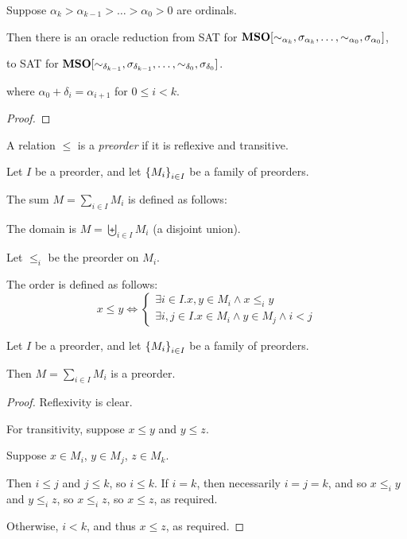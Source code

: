 \begin{theorem}
  Suppose $\alpha_k > \alpha_{k - 1} > \ldots > \alpha_0 > 0$ are ordinals.

  Then there is an oracle reduction from SAT for $\mathbf{MSO}[
      \sim_{\alpha_k}, \sigma_{\alpha_k}, \ldots, \sim_{\alpha_0}, \sigma_{\alpha_0}]$,

  to SAT for $\mathbf{MSO}[
      \sim_{\delta_{k-1}}, \sigma_{\delta_{k-1}}, \ldots, \sim_{\delta_0}, \sigma_{\delta_0}]$.

  where $\alpha_0 + \delta_i = \alpha_{i + 1}$ for $0 \le i < k$.
\end{theorem}

\begin{proof}

\end{proof}

\begin{definition}
  A relation $\le$ is a \emph{preorder} if it is reflexive and transitive.
\end{definition}

\begin{definition}
  Let $I$ be a preorder, and let $\left\{ {M_i} \right\}_{i \in I}$ be a family of preorders.

  The sum $M = \sum_{i \in I} M_i$ is defined as follows:

  The domain is $M = \biguplus_{i \in I} M_i$ (a disjoint union).

  Let $\le_i$ be the preorder on $M_i$.

  The order is defined as follows:
  \[
    x \le y \iff \begin{cases}
      \exists i \in I. x, y \in M_i \land x \le_i y \\
      \exists i, j \in I. x \in M_i \land y \in M_j \land i < j
    \end{cases}
  \]
\end{definition}

\begin{lemma}
  Let $I$ be a preorder, and let $\left\{ {M_i} \right\}_{i \in I}$ be a family of preorders.

  Then $M = \sum_{i \in I} M_i$ is a preorder.
\end{lemma}

\begin{proof}
  Reflexivity is clear.

  For transitivity, suppose $x \le y$ and $y \le z$.

  Suppose $x \in M_i$, $y \in M_j$, $z \in M_k$.

  Then $i \le j$ and $j \le k$, so $i \le k$.
  If $i = k$, then necessarily $i = j = k$, and so $x \le_i y$ and $y \le_i z$,
  so $x \le_i z$, so $x \le z$, as required.

  Otherwise, $i < k$, and thus $x \le z$, as required.
\end{proof}

